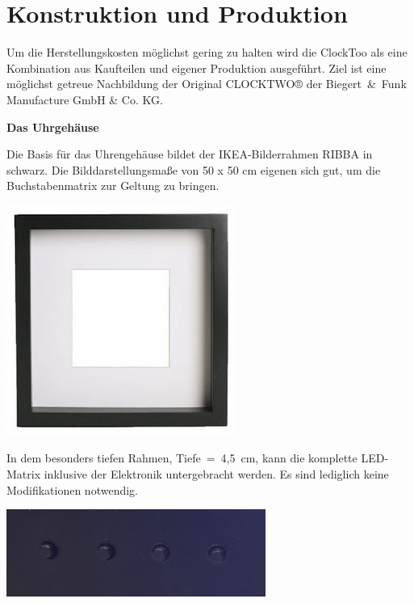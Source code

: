
\section{Konstruktion und Produktion}
\label{sec:KonstruktionFertigung}

\begin{multicols}{2}
Um die Herstellungskosten möglichst gering zu halten wird die ClockToo als eine Kombination aus Kaufteilen und eigener Produktion ausgeführt. Ziel ist eine möglichst getreue Nachbildung der Original CLOCKTWO® der Biegert~\&~Funk Manufacture GmbH \& Co. KG. 

\textbf{Das Uhrgehäuse}

Die Basis für das Uhrengehäuse bildet der IKEA-Bilderrahmen RIBBA in schwarz. Die Bilddarstellungsmaße von 50 x 50 cm eigenen sich gut, um die Buchstabenmatrix zur Geltung zu bringen. 

{
\centering \includegraphics[width=0.75\columnwidth]{Abbildungen/Konstruktion/Ribba02} %

}
In dem besonders tiefen Rahmen,  Tiefe~=~4,5~cm, kann die komplette LED-Matrix inklusive der Elektronik untergebracht werden. Es sind lediglich keine Modifikationen notwendig.

{
\centering \includegraphics[width=0.5\columnwidth]{Abbildungen/Konstruktion/Taster03} 

}
\end{multicols}

